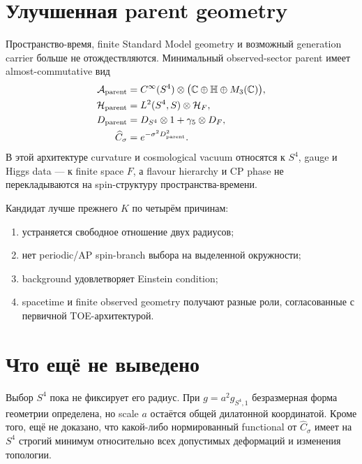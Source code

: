 \section{Улучшенная parent geometry}

Пространство-время, finite Standard Model geometry и возможный generation
carrier больше не отождествляются. Минимальный observed-sector parent имеет
almost-commutative вид
\begin{equation}
 \begin{aligned}
 \mathcal A_{\rm parent}
   &=C^\infty(S^4)\otimes
     \bigl(\mathbb C\oplus\mathbb H\oplus M_3(\mathbb C)\bigr),\\
 \mathcal H_{\rm parent}
   &=L^2(S^4,S)\otimes\mathcal H_F,\\
 D_{\rm parent}
   &=D_{S^4}\otimes1+\gamma_5\otimes D_F,\\
 \widehat C_\sigma
   &=e^{-\sigma^2D_{\rm parent}^2}.
 \end{aligned}
 \label{eq:toe-native-s4-parent}
\end{equation}
В этой архитектуре curvature и cosmological vacuum относятся к \(S^4\),
gauge и Higgs data --- к finite space \(F\), а flavour hierarchy и CP phase
не перекладываются на spin-структуру пространства-времени.

Кандидат лучше прежнего \(K\) по четырём причинам:
\begin{enumerate}
 \item устраняется свободное отношение двух радиусов;
 \item нет periodic/AP spin-branch выбора на выделенной окружности;
 \item background удовлетворяет Einstein condition;
 \item spacetime и finite observed geometry получают разные роли,
 согласованные с первичной TOE-архитектурой.
\end{enumerate}

\section{Что ещё не выведено}

Выбор \(S^4\) пока не фиксирует его радиус. При
\(g=a^2g_{S^4,1}\) безразмерная форма геометрии определена, но scale \(a\)
остаётся общей дилатонной координатой. Кроме того, ещё не доказано, что
какой-либо нормированный functional от \(\widehat C_\sigma\) имеет на
\(S^4\) строгий минимум относительно всех допустимых деформаций и изменения
топологии.

